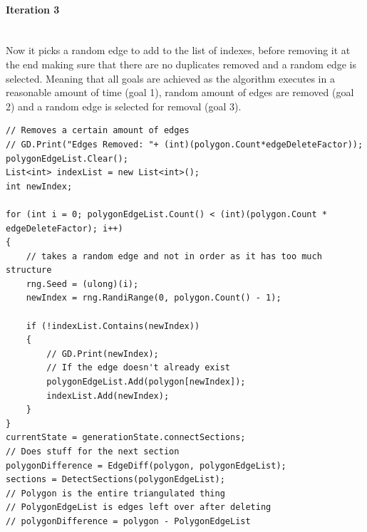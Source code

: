\documentclass{article}
\newcommand{\myparagraph}[1]{\paragraph{#1}\mbox{}\\} %
\begin{document}
\myparagraph{Iteration 3}
Now it picks a random edge to add to the list of indexes, before removing it at the end making sure that there are no duplicates removed and a random edge is selected. Meaning that all goals are achieved as the algorithm executes in a reasonable amount of time (goal 1), random amount of edges are removed (goal 2) and a random edge is selected for removal (goal 3).
\begin{lstlisting}
// Removes a certain amount of edges
// GD.Print("Edges Removed: "+ (int)(polygon.Count*edgeDeleteFactor));
polygonEdgeList.Clear();
List<int> indexList = new List<int>();
int newIndex;

for (int i = 0; polygonEdgeList.Count() < (int)(polygon.Count * edgeDeleteFactor); i++)
{
    // takes a random edge and not in order as it has too much structure
    rng.Seed = (ulong)(i);
    newIndex = rng.RandiRange(0, polygon.Count() - 1);

    if (!indexList.Contains(newIndex))
    {
        // GD.Print(newIndex);
        // If the edge doesn't already exist
        polygonEdgeList.Add(polygon[newIndex]);
        indexList.Add(newIndex);
    }
}
currentState = generationState.connectSections;
// Does stuff for the next section
polygonDifference = EdgeDiff(polygon, polygonEdgeList);
sections = DetectSections(polygonEdgeList);
// Polygon is the entire triangulated thing
// PolygonEdgeList is edges left over after deleting
// polygonDifference = polygon - PolygonEdgeList
\end{lstlisting}
\end{document}
